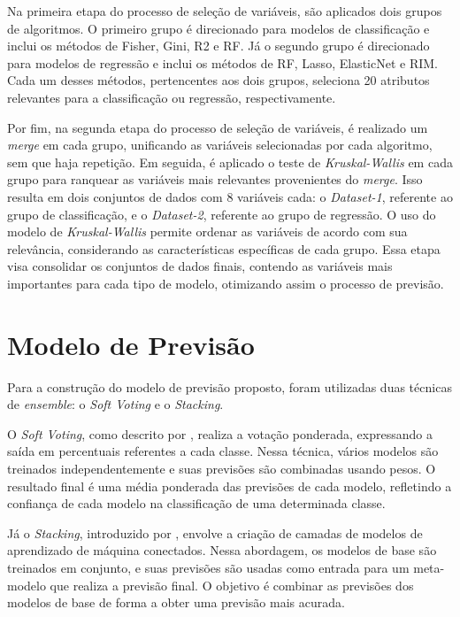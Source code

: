 Na primeira etapa do processo de seleção de variáveis, são aplicados dois grupos de algoritmos. O primeiro grupo é direcionado para modelos de classificação e inclui os métodos de Fisher, Gini, \ac{R2} e \ac{RF}. Já o segundo grupo é direcionado para modelos de regressão e inclui os métodos de \ac{RF}, Lasso, ElasticNet e \ac{RIM}. Cada um desses métodos, pertencentes aos dois grupos, seleciona 20 atributos relevantes para a classificação ou regressão, respectivamente. 

Por fim, na segunda etapa do processo de seleção de variáveis, é realizado um \textit{merge} em cada grupo, unificando as variáveis selecionadas por cada algoritmo, sem que haja repetição. Em seguida, é aplicado o teste de \textit{Kruskal-Wallis} em cada grupo para ranquear as variáveis mais relevantes provenientes do \textit{merge}. Isso resulta em dois conjuntos de dados com 8 variáveis cada: o \textit{Dataset-1}, referente ao grupo de classificação, e o \textit{Dataset-2}, referente ao grupo de regressão. O uso do modelo de \textit{Kruskal-Wallis} permite ordenar as variáveis de acordo com sua relevância, considerando as características específicas de cada grupo. Essa etapa visa consolidar os conjuntos de dados finais, contendo as variáveis mais importantes para cada tipo de modelo, otimizando assim o processo de previsão.




\section{Modelo de Previsão}
\label{sec:previsao}
Para a construção do modelo de previsão proposto, foram utilizadas duas técnicas de \textit{ensemble}: o \textit{Soft Voting} e o \textit{Stacking}.

O \textit{Soft Voting}, como descrito por , realiza a votação ponderada, expressando a saída em percentuais referentes a cada classe. Nessa técnica, vários modelos são treinados independentemente e suas previsões são combinadas usando pesos. O resultado final é uma média ponderada das previsões de cada modelo, refletindo a confiança de cada modelo na classificação de uma determinada classe.

Já o \textit{Stacking}, introduzido por , envolve a criação de camadas de modelos de aprendizado de máquina conectados. Nessa abordagem, os modelos de base são treinados em conjunto, e suas previsões são usadas como entrada para um meta-modelo que realiza a previsão final. O objetivo é combinar as previsões dos modelos de base de forma a obter uma previsão mais acurada.

